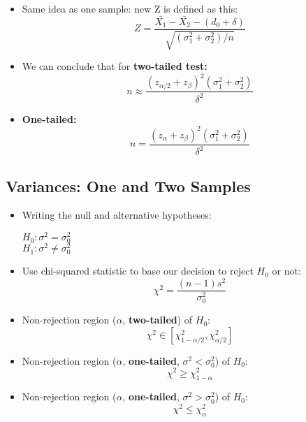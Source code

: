 \documentclass[10pt, letterpaper, twoside]{article}
\begin{document}
\begin{multicols}{2}
\begin{itemize}
    \item Same idea as one sample: new Z is defined as this:
    \begin{equation*}
        Z = \frac{\bar{X_1} - \bar{X_2} - (d_0 + \delta)}{\sqrt{(\sigma_1^2 + \sigma_2^2)/n}}
    \end{equation*}
    \item We can conclude that for \textbf{two-tailed test:}
    \begin{equation*}
        n \approx \frac{(z_{\alpha/2} + z_{\beta})^2(\sigma_1^2+\sigma_2^2)}{\delta^2}
    \end{equation*}
    \item \textbf{One-tailed:}
    \begin{equation*}
         n = \frac{(z_{\alpha} + z_{\beta})^2(\sigma_1^2+\sigma_2^2)}{\delta^2}
    \end{equation*}
\end{itemize}

\subsection{Variances: One and Two Samples}

\begin{itemize}
    \item Writing the null and alternative hypotheses:
        \begin{center}
        $H_0: \sigma^2 = \sigma_0^2$\\
        $H_1: \sigma^2 \neq \sigma_0^2$
    \end{center}
    \item Use chi-squared statistic to base our decision to reject $H_0$ or not:
    \begin{equation*}
        \chi^2 = \frac{(n-1)s^2}{\sigma_0^2}
    \end{equation*}
    \item Non-rejection region ($\alpha$, \textbf{two-tailed}) of $H_0$:
    \begin{equation*}
        \chi^2 \in [\chi^2_{1-\alpha/2}, \chi^2_{\alpha/2}]
    \end{equation*}
    \item Non-rejection region ($\alpha$, \textbf{one-tailed}, $\sigma^2 < \sigma_0^2$) of $H_0$:
    \begin{equation*}
        \chi^2 \geq \chi^2_{1-\alpha}
    \end{equation*}
    \item Non-rejection region ($\alpha$, \textbf{one-tailed}, $\sigma^2 > \sigma^2_0$) of $H_0$:
    \begin{equation*}
        \chi^2 \leq \chi^2_{\alpha}
    \end{equation*}
    
\end{itemize}

\end{multicols}
\end{document}
